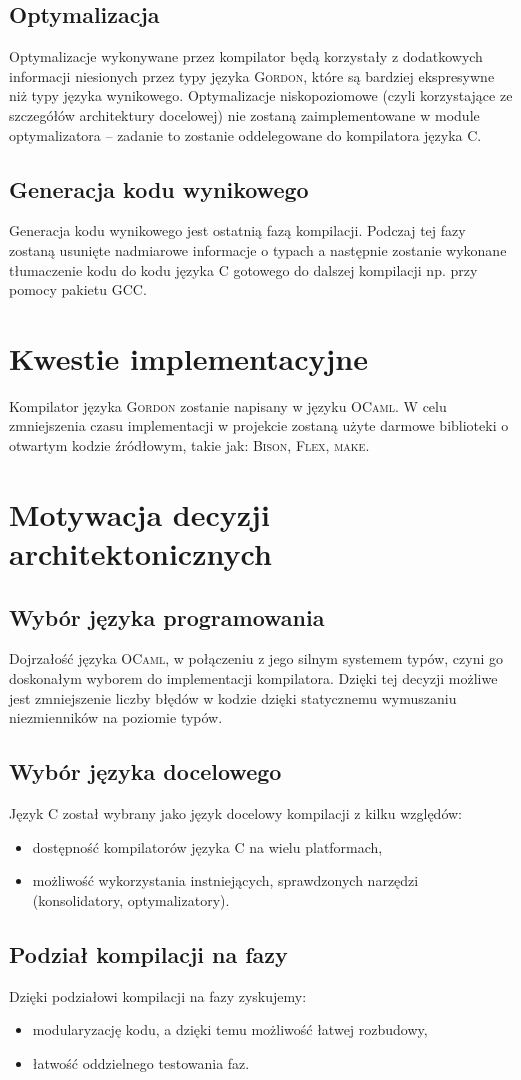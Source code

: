\documentclass{documentation}
\begin{document}
\subsection{Optymalizacja}
\noindent Optymalizacje wykonywane przez kompilator będą korzystały z dodatkowych informacji
niesionych przez typy języka \textsc{Gordon}, które są bardziej ekspresywne niż typy języka
wynikowego.
Optymalizacje niskopoziomowe (czyli korzystające ze szczegółów architektury docelowej) nie
zostaną zaimplementowane w module optymalizatora -- zadanie to zostanie oddelegowane do
kompilatora języka \textsc{C}.

\subsection{Generacja kodu wynikowego}
\noindent Generacja kodu wynikowego jest ostatnią fazą kompilacji. Podczaj tej fazy zostaną
usunięte nadmiarowe informacje o typach a następnie zostanie wykonane tłumaczenie kodu
do kodu języka \textsc{C} gotowego do dalszej kompilacji np. przy pomocy pakietu \textsc{GCC}.

\section{Kwestie implementacyjne}
\noindent Kompilator języka \textsc{Gordon} zostanie napisany w języku \textsc{OCaml}. W celu
zmniejszenia czasu implementacji w projekcie zostaną użyte darmowe biblioteki o otwartym
kodzie źródłowym, takie jak: \textsc{Bison}, \textsc{Flex}, \textsc{make}.

\section{Motywacja decyzji architektonicznych}
\subsection{Wybór języka programowania}
\noindent Dojrzałość języka \textsc{OCaml}, w połączeniu z jego silnym systemem typów,
czyni go doskonałym wyborem do implementacji kompilatora. Dzięki tej
decyzji możliwe jest zmniejszenie liczby błędów w kodzie dzięki statycznemu
wymuszaniu niezmienników na poziomie typów.

\subsection{Wybór języka docelowego}
\noindent Język \textsc{C} został wybrany jako język docelowy kompilacji z kilku względów:
\begin{itemize}
    \item dostępność kompilatorów języka \textsc{C} na wielu platformach,
    \item możliwość wykorzystania instniejących, sprawdzonych narzędzi (konsolidatory,
        optymalizatory).
\end{itemize}

\subsection{Podział kompilacji na fazy}
\noindent Dzięki podziałowi kompilacji na fazy zyskujemy:
\begin{itemize}
    \item modularyzację kodu, a dzięki temu możliwość łatwej rozbudowy,
    \item łatwość oddzielnego testowania faz.
\end{itemize}
\end{document}
